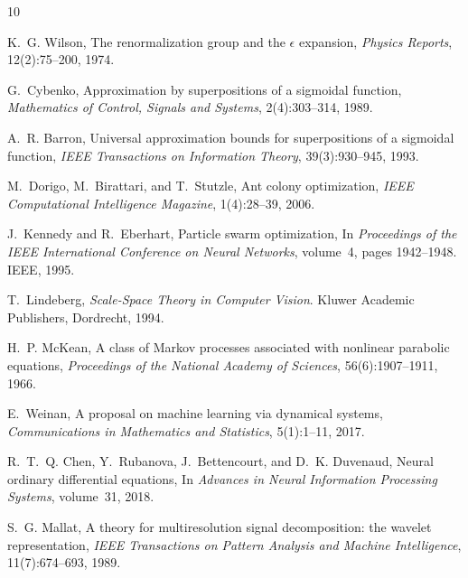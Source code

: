 \documentclass[12pt,a4paper]{article}
\theoremstyle{plain}
\theoremstyle{definition}
\theoremstyle{remark}
\begin{document}

\begin{thebibliography}{10}

K.~G. Wilson,
\newblock The renormalization group and the $\epsilon$ expansion,
\newblock \emph{Physics Reports}, 12(2):75--200, 1974.

G.~Cybenko,
\newblock Approximation by superpositions of a sigmoidal function,
\newblock \emph{Mathematics of Control, Signals and Systems}, 2(4):303--314, 1989.

A.~R. Barron,
\newblock Universal approximation bounds for superpositions of a sigmoidal
  function,
\newblock \emph{IEEE Transactions on Information Theory}, 39(3):930--945, 1993.

M.~Dorigo, M.~Birattari, and T.~Stutzle,
\newblock Ant colony optimization,
\newblock \emph{IEEE Computational Intelligence Magazine}, 1(4):28--39, 2006.

J.~Kennedy and R.~Eberhart,
\newblock Particle swarm optimization,
\newblock In \emph{Proceedings of the IEEE International Conference on Neural
  Networks}, volume~4, pages 1942--1948. IEEE, 1995.

T.~Lindeberg,
\newblock \emph{Scale-Space Theory in Computer Vision}.
\newblock Kluwer Academic Publishers, Dordrecht, 1994.

H.~P. McKean,
\newblock A class of Markov processes associated with nonlinear parabolic
  equations,
\newblock \emph{Proceedings of the National Academy of Sciences},
  56(6):1907--1911, 1966.

E.~Weinan,
\newblock A proposal on machine learning via dynamical systems,
\newblock \emph{Communications in Mathematics and Statistics}, 5(1):1--11, 2017.

R.~T.~Q. Chen, Y.~Rubanova, J.~Bettencourt, and D.~K. Duvenaud,
\newblock Neural ordinary differential equations,
\newblock In \emph{Advances in Neural Information Processing Systems},
  volume~31, 2018.

S.~G. Mallat,
\newblock A theory for multiresolution signal decomposition: the wavelet
  representation,
\newblock \emph{IEEE Transactions on Pattern Analysis and Machine Intelligence},
  11(7):674--693, 1989.

\end{thebibliography}
\end{document}
